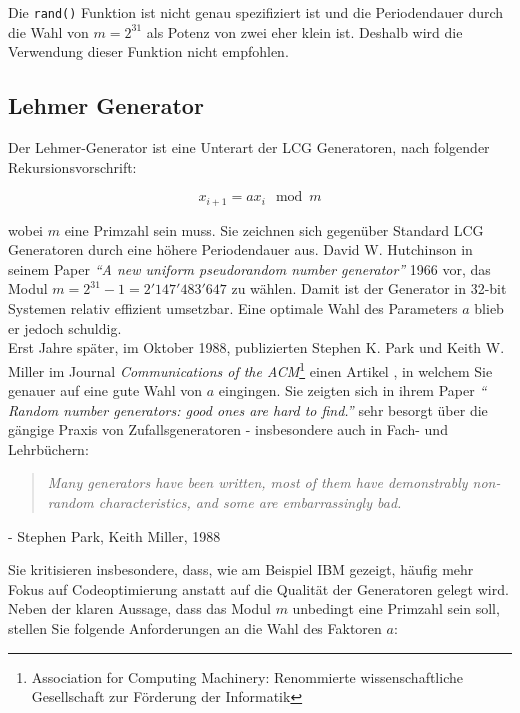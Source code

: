 \documentclass{book}
\begin{document}
\begin{refsection}
Die \texttt{rand()} Funktion ist nicht genau spezifiziert ist und die Periodendauer durch die Wahl von $m=2^{31}$ als Potenz von zwei eher klein ist. Deshalb wird die Verwendung dieser Funktion nicht empfohlen.

\subsection{Lehmer Generator} \label{subsec:Lehmer}
Der Lehmer-Generator ist eine Unterart der LCG Generatoren, nach folgender Rekursionsvorschrift:

\begin{equation}
	x_{i+1} = a x_{i} \mod{m}
	\label{equ:lehmer}
\end{equation}

wobei $m$ eine Primzahl sein muss. Sie zeichnen sich gegenüber Standard LCG Generatoren durch eine höhere Periodendauer aus. David W. Hutchinson in seinem Paper \textit{``A new uniform pseudorandom number generator''} 1966 \cite{rng:Hutchinson1966} vor, das Modul  $m = 2^{31} - 1 = 2'147'483'647$ zu wählen. Damit ist der Generator in 32-bit Systemen relativ effizient umsetzbar. Eine optimale Wahl des Parameters $a$ blieb er jedoch schuldig. \\

Erst Jahre später, im Oktober 1988, publizierten Stephen K. Park und Keith W. Miller im Journal \textit{Communications of the ACM}\footnote{Association for Computing Machinery: Renommierte wissenschaftliche Gesellschaft zur Förderung der Informatik} einen Artikel \cite{rng:ParkMiller1988}, in welchem Sie genauer auf eine gute Wahl von $a$ eingingen. Sie zeigten sich in ihrem Paper \textit{`` Random number generators: good ones are hard to find.''} sehr besorgt über die gängige Praxis von Zufallsgeneratoren - insbesondere auch in Fach- und Lehrbüchern:

\begin{quote}
	\textit{Many generators have been written, most of them have demonstrably non-random characteristics, and some are embarrassingly bad.}
\end{quote}
\begin{flushright}
	- Stephen Park, Keith Miller, 1988 \cite{rng:ParkMiller1988}
\end{flushright}

Sie kritisieren insbesondere, dass, wie am Beispiel IBM gezeigt, häufig mehr Fokus auf Codeoptimierung anstatt auf die Qualität der Generatoren gelegt wird. Neben der klaren Aussage, dass das Modul $m$ unbedingt eine Primzahl sein soll, stellen Sie folgende Anforderungen an die Wahl des Faktoren $a$:


\end{refsection}
\end{document}
